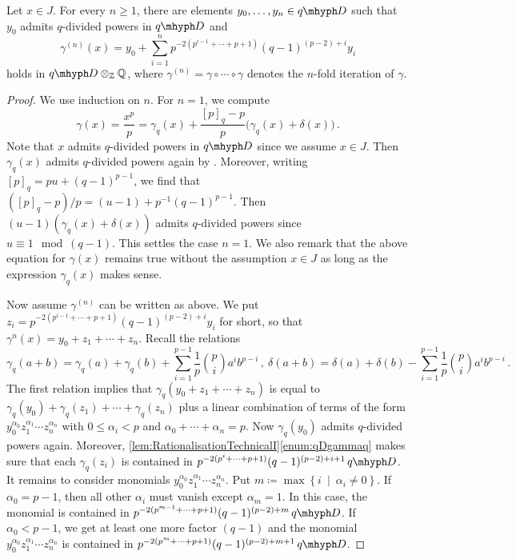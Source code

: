 \documentclass[DIV=12,numbers=enddot,leqno,bibliography=totoc]{scrartcl}
\begin{document}
	\begin{lem}\label{lem:RationalisationTechnicalII}
		Let $x\in J$. For every $n\geqslant 1$, there are elements $y_0,\dotsc,y_n\in \q D$ such that $y_0$ admits $q$-divided powers in $\q D$ and
		\begin{equation*}
			\gamma^{(n)}(x)=y_0+\sum_{i=1}^np^{-2(p^{i-1}+\dotsb+p+1)}(q-1)^{(p-2)+i}y_i
		\end{equation*}
		holds in $\q D\otimes_{\IZ}\IQ$, where $\gamma^{(n)}=\gamma\circ \dotsb\circ\gamma$ denotes the $n$-fold iteration of $\gamma$.
	\end{lem}
	\begin{proof}
		We use induction on $n$. For $n=1$, we compute
		\begin{equation*}
			\gamma(x)=\frac{x^p}{p}=\gamma_q(x)+\frac{[p]_q-p}{p}\bigl(\gamma_q(x)+\delta(x)\bigr)\,.
		\end{equation*}
		Note that $x$ admits $q$-divided powers in $\q D$ since we assume $x\in J$. Then $\gamma_q(x)$ admits $q$-divided powers again by \cite[Lemma~]{Prismatic}. Moreover, writing $[p]_q=pu+(q-1)^{p-1}$, we find that $([p]_q-p)/p=(u-1)+p^{-1}(q-1)^{p-1}$. Then $(u-1)(\gamma_q(x)+\delta(x))$ admits $q$-divided powers since $u\equiv 1\mod (q-1)$. This settles the case $n=1$. We also remark that the above equation for $\gamma(x)$ remains true without the assumption $x\in J$ as long as the expression $\gamma_q(x)$ makes sense.
		
		Now assume $\gamma^{(n)}$ can be written as above. We put $z_i=p^{-2(p^{i-1}+\dotsb+p+1)}(q-1)^{(p-2)+i}y_i$ for short, so that $\gamma^n(x)=y_0+z_1+\dotsb+z_n$. Recall the relations
		\begin{equation*}
			\gamma_q(a+b)=\gamma_q(a)+\gamma_q(b)+\sum_{i=1}^{p-1}\frac1p\binom pia^ib^{p-i}\,,\ \delta(a+b)=\delta(a)+\delta(b)-\sum_{i=1}^{p-1}\frac1p\binom pia^ib^{p-i}\,.
		\end{equation*}
		The first relation implies that $\gamma_q(y_0+z_1+\dotsb+z_n)$ is equal to $\gamma_q(y_0)+\gamma_q(z_1)+\dotsb+\gamma_q(z_n)$ plus a linear combination of terms of the form $y_0^{\alpha_0}z_1^{\alpha_1}\dotsm z_n^{\alpha_n}$ with $0\leqslant \alpha_i<p$ and $\alpha_0+\dotsb+\alpha_n=p$. Now $\gamma_q(y_0)$ admits $q$-divided powers again. Moreover, \cref{lem:RationalisationTechnicalI}\cref{enum:qDgammaq} makes sure that each $\gamma_q(z_i)$ is contained in $p^{-2(p^i+\dotsb+p+1)}(q-1)^{(p-2)+i+1}\q D$. It remains to consider monomials $y_0^{\alpha_0}z_1^{\alpha_1}\dotsm z_n^{\alpha_n}$. Put $m\coloneqq \max\left\{i\ \middle|\  \alpha_i\neq 0\right\}$. If $\alpha_0=p-1$, then all other $\alpha_i$ must vanish except $\alpha_m=1$. In this case, the monomial is contained in $p^{-2(p^{m-1}+\dotsb+p+1)}(q-1)^{(p-2)+m}\q D$. If $\alpha_0<p-1$, we get at least one more factor $(q-1)$ and the monomial $y_0^{\alpha_0}z_1^{\alpha_1}\dotsm z_n^{\alpha_n}$ is contained in $p^{-2(p^m+\dotsb+p+1)}(q-1)^{(p-2)+m+1}\q D$.
		

\end{proof}
\end{document}
